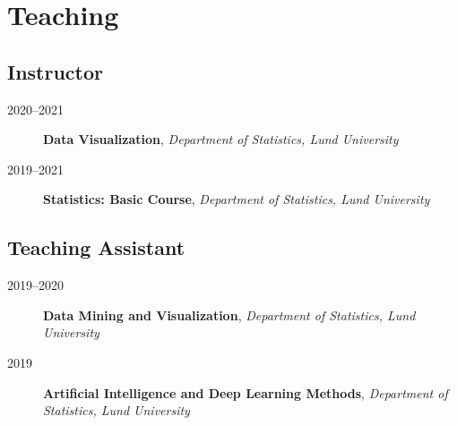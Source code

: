 \documentclass[
  10pt,
  headsepline=true,
  english,
  DIV=12
]{scrartcl}
\renewcommand*{%
  \mkbibnamegiven
}[1]{\ifitemannotation{highlight}{\textbf{#1}}{#1}}
\renewcommand*{%
  \mkbibnamefamily
}[1]{\ifitemannotation{highlight}{\textbf{#1}}{#1}}
\begin{document}
\hypertarget{teaching}{%
  \section{Teaching}\label{teaching}}

\subsection{Instructor}

\begin{description}
  \item[2020--2021]{
        \textbf{Data Visualization}, \emph{Department of Statistics, Lund
          University}
        }
  \item[2019--2021]{
        \textbf{Statistics: Basic Course}, \emph{Department of Statistics, Lund
          University}

        }
\end{description}

\subsection{Teaching Assistant}

\begin{description}

  \item[2019--2020]{
        \textbf{Data Mining and Visualization}, \emph{Department of Statistics,
          Lund University}

        }

  \item[2019]{
        \textbf{Artificial Intelligence and Deep Learning Methods},
        \emph{Department of Statistics, Lund University}

        }

\end{description}
\end{document}
